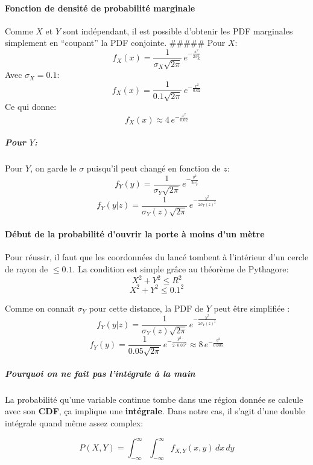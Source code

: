 \paragraph{Fonction de densité de probabilité
marginale}\label{fonction-de-densituxe9-de-probabilituxe9-marginale}

Comme \(X\) et \(Y\) sont indépendant, il est possible d'obtenir les PDF
marginales simplement en ``coupant'' la PDF conjointe. \#\#\#\#\# Pour
\(X\): \[
f_X(x) =
\frac{1}{\sigma_X \sqrt{2\pi}} \, e^{-\frac{x^2}{2\sigma_X^2}}
\] Avec \(\sigma_X = 0.1\): \[
f_X(x) =
\frac{1}{0.1 \sqrt{2\pi}} \, e^{-\frac{x^2}{0.02}}
\] Ce qui donne: \[
f_X(x) \approx 4 \, e^{-\frac{x^2}{0.02}}
\]

\subparagraph{\texorpdfstring{Pour \(Y\):}{Pour Y:}}\label{pour-y}

Pour \(Y\), on garde le \(\sigma\) puisqu'il peut changé en fonction de
\(z\): \[
f_Y(y) =
\frac{1}{\sigma_Y \sqrt{2\pi}} \, e^{-\frac{y^2}{2\sigma_Y^2}}
\] \[
f_Y(y|z) =
\frac{1}{\sigma_Y(z) \sqrt{2\pi}} \, e^{-\frac{y^2}{2\sigma_Y(z)^2}}
\]

\paragraph{Début de la probabilité d'ouvrir la porte à moins d'un
mètre}\label{duxe9but-de-la-probabilituxe9-douvrir-la-porte-uxe0-moins-dun-muxe8tre}

Pour réussir, il faut que les coordonnées du lancé tombent à l'intérieur
d'un cercle de rayon de \(\le 0.1\). La condition est simple grâce au
théorème de Pythagore: \[
X^2 + Y^2 \le R^2
\] \[
X^2 + Y^2 \le 0.1^2
\]

Comme on connaît \(\sigma_Y\) pour cette distance, la PDF de \(Y\) peut
être simplifiée : \[
f_Y(y|z) = \frac{1}{\sigma_Y(z) \sqrt{2\pi}} \, e^{-\frac{y^2}{2\sigma_Y(z)^2}}
\] \[
f_Y(y) = \frac{1}{0.05 \sqrt{2\pi}} \, e^{-\frac{y^2}{2\cdot 0.05^2}} \approx 8 \, e^{-\frac{y^2}{0.005}}
\]

\subparagraph{Pourquoi on ne fait pas l'intégrale à la
main}\label{pourquoi-on-ne-fait-pas-lintuxe9grale-uxe0-la-main}

La probabilité qu'une variable continue tombe dans une région donnée se
calcule avec son \textbf{CDF}, ça implique une \textbf{intégrale}. Dans
notre cas, il s'agit d'une double intégrale quand même assez complex:

\[
P(X,Y) = \int_{-\infty}^{\infty} \int_{-\infty}^{\infty} f_{X,Y}(x,y) \, dx \, dy
\]


